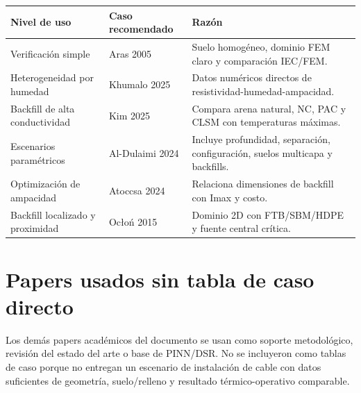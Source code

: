 \documentclass[11pt,a4paper,oneside]{report}
\begin{document}
\begin{longtable}[]{@{}
  >{\raggedright\arraybackslash}p{}
  >{\raggedright\arraybackslash}p{}
  >{\raggedright\arraybackslash}p{}@{}}
\toprule\noalign{}
\begin{minipage}[b]{\linewidth}\raggedright
Nivel de uso
\end{minipage} & \begin{minipage}[b]{\linewidth}\raggedright
Caso recomendado
\end{minipage} & \begin{minipage}[b]{\linewidth}\raggedright
Razón
\end{minipage} \\
\midrule\noalign{}
\endhead
\bottomrule\noalign{}
\endlastfoot
Verificación simple & Aras 2005 & Suelo homogéneo, dominio FEM claro y
comparación IEC/FEM. \\
Heterogeneidad por humedad & Khumalo 2025 & Datos numéricos directos de
resistividad-humedad-ampacidad. \\
Backfill de alta conductividad & Kim 2025 & Compara arena natural, NC,
PAC y CLSM con temperaturas máximas. \\
Escenarios paramétricos & Al-Dulaimi 2024 & Incluye profundidad,
separación, configuración, suelos multicapa y backfills. \\
Optimización de ampacidad & Atoccsa 2024 & Relaciona dimensiones de
backfill con Imax y costo. \\
Backfill localizado y proximidad & Ocłoń 2015 & Dominio 2D con
FTB/SBM/HDPE y fuente central crítica. \\
\end{longtable}

\section{Papers usados sin tabla de caso
directo}\label{papers-usados-sin-tabla-de-caso-directo}

Los demás papers académicos del documento se usan como soporte
metodológico, revisión del estado del arte o base de PINN/DSR. No se
incluyeron como tablas de caso porque no entregan un escenario de
instalación de cable con datos suficientes de geometría, suelo/relleno y
resultado térmico-operativo comparable.
\end{document}
